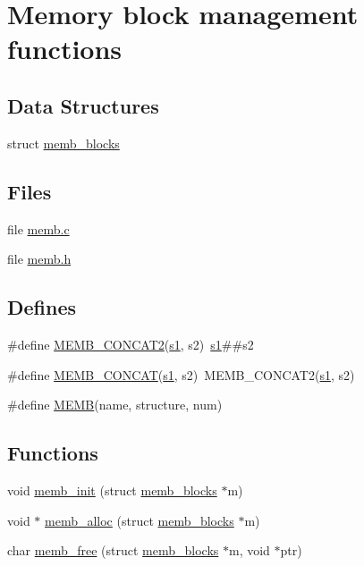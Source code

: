\hypertarget{group__memb}{
\section{Memory block management functions}
\label{group__memb}
}
\subsection*{Data Structures}
\begin{DoxyCompactItemize}
\item 
struct \hyperlink{structmemb__blocks}{memb\_\-blocks}
\end{DoxyCompactItemize}
\subsection*{Files}
\begin{DoxyCompactItemize}
\item 
file \hyperlink{memb_8c}{memb.c}
\item 
file \hyperlink{memb_8h}{memb.h}
\end{DoxyCompactItemize}
\subsection*{Defines}
\begin{DoxyCompactItemize}
\item 
\#define \hyperlink{group__memb_gaa680bc3f3a1a8a6aec20fe729d138cb8}{MEMB\_\-CONCAT2}(\hyperlink{sft_8h_acfb6b9e2b00e34da4313b463c341e597}{s1}, s2)~\hyperlink{sft_8h_acfb6b9e2b00e34da4313b463c341e597}{s1}\#\#s2
\item 
\#define \hyperlink{group__memb_ga720ac440c7b24bdd07c53ba146e36fb2}{MEMB\_\-CONCAT}(\hyperlink{sft_8h_acfb6b9e2b00e34da4313b463c341e597}{s1}, s2)~MEMB\_\-CONCAT2(\hyperlink{sft_8h_acfb6b9e2b00e34da4313b463c341e597}{s1}, s2)
\item 
\#define \hyperlink{group__memb_gaf31774d02a69fd3f1c2b282454438cba}{MEMB}(name, structure, num)
\end{DoxyCompactItemize}
\subsection*{Functions}
\begin{DoxyCompactItemize}
\item 
void \hyperlink{group__memb_gad58a6c7e62ae59bf7a016ded12ca2910}{memb\_\-init} (struct \hyperlink{structmemb__blocks}{memb\_\-blocks} $\ast$m)
\item 
void $\ast$ \hyperlink{group__memb_gafe5e93119035e14cc485760a176249ba}{memb\_\-alloc} (struct \hyperlink{structmemb__blocks}{memb\_\-blocks} $\ast$m)
\item 
char \hyperlink{group__memb_gaceb952d27de8125d5146ac0bee325b8f}{memb\_\-free} (struct \hyperlink{structmemb__blocks}{memb\_\-blocks} $\ast$m, void $\ast$ptr)
\end{DoxyCompactItemize}



